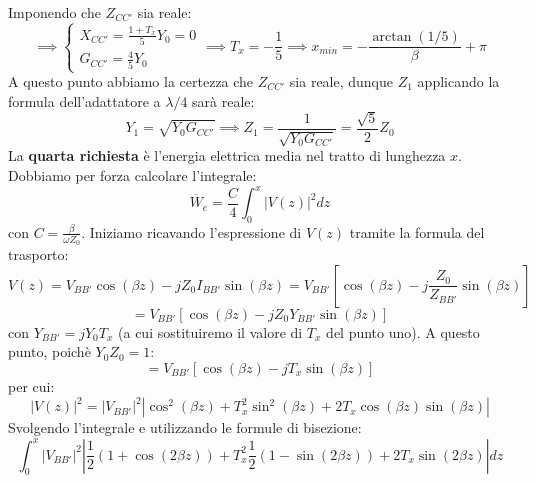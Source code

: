 \documentclass{book}
\begin{document}
        Imponendo che $Z_{CC'}$ sia reale:
        \begin{equation}
            \implies 
            \begin{cases}
                X_{CC'} = \frac{1+T_{x}}{5}Y_{0} = 0 \\
                G_{CC'} = \frac{4}{5}Y_{0}
            \end{cases} \implies T_{x}=-\frac{1}{5} \implies x_{min} =-\frac{\arctan(1/5)}{\beta}+\pi
        \end{equation}
        A questo punto abbiamo la certezza che $Z_{CC'}$ sia reale, dunque $Z_{1}$ applicando la formula dell'adattatore 
        a $\lambda/4$ sarà reale:
        \begin{equation}
            Y_{1} = \sqrt{Y_{0}G_{CC'}} \implies Z_{1} = \frac{1}{\sqrt{Y_{0}G_{CC'}}} = \frac{\sqrt{5}}{2}Z_{0}
        \end{equation}
    La \textbf{quarta richiesta} è l'energia elettrica media nel tratto di lunghezza $x$. Dobbiamo per forza calcolare l'integrale:
    \begin{equation}
        \overline{W}_{e} = \frac{C}{4} \int_{0} ^{x} |V(z)|^{2}dz
    \end{equation}
    con $C=\frac{\beta}{\omega Z_{0}}$. Iniziamo ricavando l'espressione di $V(z)$ tramite la formula del trasporto:
    \begin{equation}
        V(z) = V_{BB'}\cos(\beta z)-jZ_{0}I_{BB'}\sin(\beta z) = V_{BB'}[\cos(\beta z)-j\frac{Z_{0}}{Z_{BB'}}\sin(\beta z)]
    \end{equation}
    \begin{equation}
        =V_{BB'}[\cos(\beta z)-jZ_{0}Y_{BB'}\sin(\beta z)]
    \end{equation}
    con $Y_{BB'}=jY_{0}T_{x}$ (a cui sostituiremo il valore di $T_{x}$ del punto uno). A questo punto, poichè $Y_{0}Z_{0}=1$:
    \begin{equation}
        =V_{BB'}[\cos(\beta z)-jT_{x}\sin(\beta z)]
    \end{equation}
    per cui:
    \begin{equation}
        |V(z)|^{2} = |V_{BB'}|^{2}|\cos^{2}(\beta z)+T_{x} ^{2} \sin ^{2} (\beta z) +2T_{x}\cos(\beta z) \sin(\beta z)|
    \end{equation}
    Svolgendo l'integrale e utilizzando le formule di bisezione:
    \begin{equation}
        \int_{0} ^{x} |V_{BB'}|^{2}|\frac{1}{2}(1+\cos(2\beta z))+T_{x} ^{2} \frac{1}{2}(1-\sin (2\beta z)) +2T_{x}\sin(2\beta z)|dz
    \end{equation}
\end{document}
